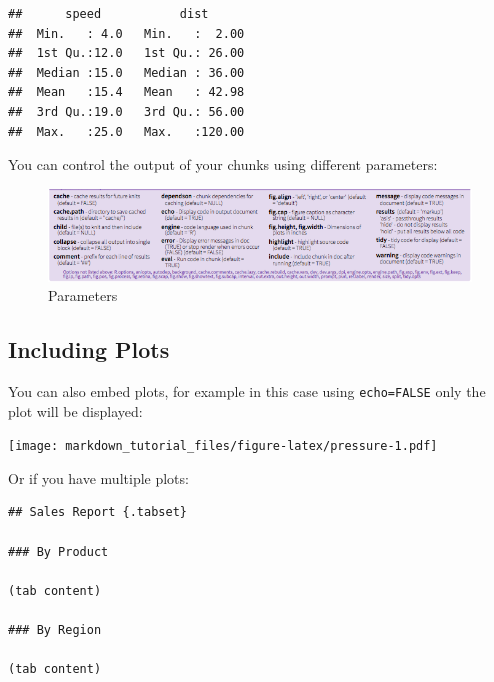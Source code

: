 \documentclass[
]{article}
\newenvironment{Shaded}{\begin{snugshade}}{\end{snugshade}}
\newcommand{\CommentTok}[1]{\textcolor[rgb]{0.56,0.35,0.01}{\textit{#1}}}
\begin{document}
\begin{verbatim}
##      speed           dist       
##  Min.   : 4.0   Min.   :  2.00  
##  1st Qu.:12.0   1st Qu.: 26.00  
##  Median :15.0   Median : 36.00  
##  Mean   :15.4   Mean   : 42.98  
##  3rd Qu.:19.0   3rd Qu.: 56.00  
##  Max.   :25.0   Max.   :120.00
\end{verbatim}

You can control the output of your chunks using different parameters:

\begin{Shaded}
\end{Shaded}

\begin{figure}
\centering
\includegraphics{chunk_parameters.png}
\caption{Parameters}
\end{figure}

\hypertarget{including-plots}{%
\subsection{Including Plots}\label{including-plots}}

You can also embed plots, for example in this case using
\texttt{echo=FALSE} only the plot will be displayed:

\texttt{[image: markdown\_tutorial\_files/figure-latex/pressure-1.pdf]}

Or if you have multiple plots:

\begin{verbatim}
## Sales Report {.tabset}
 
### By Product
 
(tab content)
 
### By Region
 
(tab content)
\end{verbatim}
\end{document}
